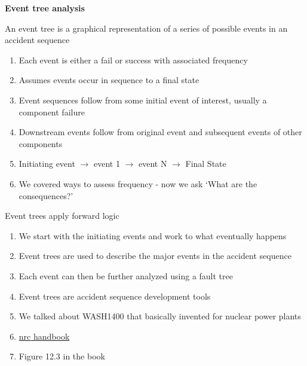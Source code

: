 \documentclass[aspectratio=1610,pdftex,dvipsnames,compress,xcolor={dvipsnames}]{beamer}
\newcommand{\acs}{\acrshort} %
\begin{document}
\begin{frame}[plain]{}
    \centering\LARGE\textbf{Event tree analysis}
\end{frame}


\addtocounter{framenumber}{-1}
\begin{frame}{An event tree is a graphical representation of a series of possible events in an accident sequence}
    \begin{enumerate}[series=outerlist,topsep=0pt,itemsep=17pt,leftmargin=*,label=(\arabic*)]
        \item[]Each event is either a fail or success with associated frequency
        \item[]Assumes events occur in sequence to a final state
        \item[]Event sequences follow from some initial event of interest, usually a component failure
        \item[]Downstream events follow from original event and subsequent events of other components
        \item[]Initiating event $\rightarrow$ event 1 $\rightarrow$ event N $\rightarrow$ Final State
        \item[]We covered ways to assess frequency - now we ask `What are the consequences?'
    \end{enumerate}
\end{frame}


\begin{frame}{Event trees apply forward logic}
    \begin{enumerate}[series=outerlist,topsep=0pt,itemsep=17pt,leftmargin=*,label=(\arabic*)]
        \item[]We start with the initiating events and work to what eventually happens
        \item[]Event trees are used to describe the major events in the accident sequence 
        \item[]Each event can then be further analyzed using a fault tree
        \item[]Event trees are accident sequence development tools
        \item[]We talked about WASH1400 that basically invented for nuclear power plants
        \item[]\href{http://www.nrc.gov/reading-rm/doc-collections/nuregs/staff/sr0492/}{\acs{nrc} handbook}
        \item[]Figure 12.3 in the book
    \end{enumerate}
\end{frame}
\end{document}
